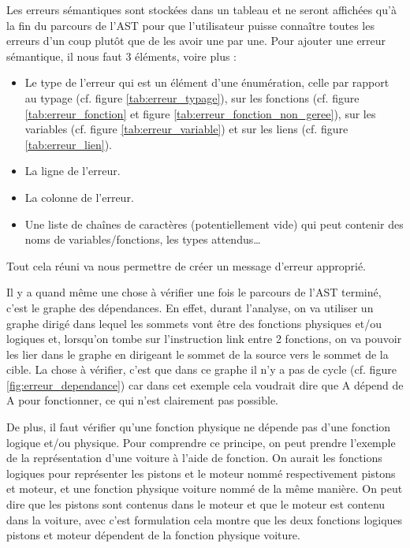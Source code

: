 \documentclass[a4paper, 11pt]{article}
\begin{document}
Les erreurs sémantiques sont stockées dans un tableau et ne seront affichées qu'à la fin du parcours de l'AST pour que l'utilisateur puisse connaître toutes les erreurs d'un coup plutôt que de les avoir une par une. Pour ajouter une erreur sémantique, il nous faut 3 éléments, voire plus :
\begin{itemize}
    \item Le type de l'erreur qui est un élément d'une énumération, celle par rapport au typage (cf. figure \ref{tab:erreur_typage}), sur les fonctions (cf. figure \ref{tab:erreur_fonction} et figure \ref{tab:erreur_fonction_non_geree}), sur les variables (cf. figure \ref{tab:erreur_variable}) et sur les liens (cf. figure \ref{tab:erreur_lien}).
    \item La ligne de l'erreur.
    \item La colonne de l'erreur.
    \item Une liste de chaînes de caractères (potentiellement vide) qui peut contenir des noms de variables/fonctions, les types attendus…
\end{itemize}

Tout cela réuni va nous permettre de créer un message d'erreur approprié.

Il y a quand même une chose à vérifier une fois le parcours de l'AST terminé, c'est le graphe des dépendances. En effet, durant l'analyse, on va utiliser un graphe dirigé dans lequel les sommets vont être des fonctions physiques et/ou logiques et, lorsqu'on tombe sur l'instruction link entre 2 fonctions, on va pouvoir les lier dans le graphe en dirigeant le sommet de la source vers le sommet de la cible. La chose à vérifier, c'est que dans ce graphe il n'y a pas de cycle (cf. figure \ref{fig:erreur_dependance}) car dans cet exemple cela voudrait dire que A dépend de A pour fonctionner, ce qui n'est clairement pas possible.

De plus, il faut vérifier qu'une fonction physique ne dépende pas d'une fonction logique et/ou physique. Pour comprendre ce principe, on peut prendre l'exemple de la représentation d'une voiture à l'aide de fonction. On aurait les fonctions logiques pour représenter les pistons et le moteur nommé respectivement pistons et moteur, et une fonction physique voiture nommé de la même manière. On peut dire que les pistons sont contenus dans le moteur et que le moteur est contenu dans la voiture, avec c'est formulation cela montre que les deux fonctions logiques pistons et moteur dépendent de la fonction physique voiture. 
\end{document}
